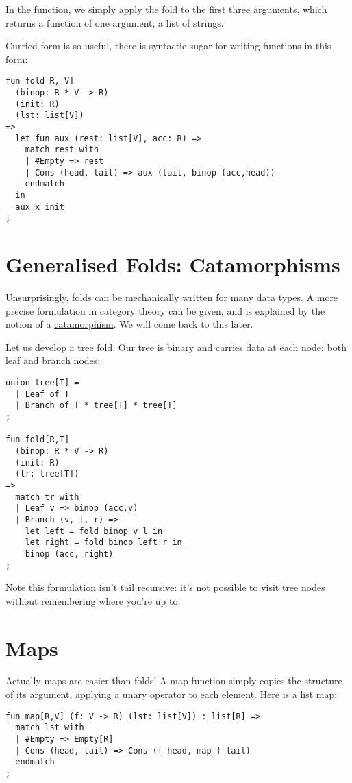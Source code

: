 \documentclass[oneside]{book}
\begin{document}
In the function, we simply apply the fold to the
first three arguments, which returns a function 
of one argument, a list of strings.

Curried form is so useful, there is syntactic sugar
for writing functions in this form:

\begin{verbatim}
fun fold[R, V] 
  (binop: R * V -> R)
  (init: R)
  (lst: list[V])
=>
  let fun aux (rest: list[V], acc: R) =>
    match rest with
    | #Empty => rest
    | Cons (head, tail) => aux (tail, binop (acc,head))
    endmatch
  in 
  aux x init
;
\end{verbatim}

\section{Generalised Folds: Catamorphisms}
Unsurprisingly, folds can be mechanically written
for many data types. A more precise formulation in
category theory can be given, and is explained by
the notion of a
\href{https://en.wikipedia.org/wiki/Catamorphism}{catamorphism}.
We will come back to this later.

Let us develop a tree fold. Our tree is binary and carries
data at each node: both leaf and branch nodes:

\begin{verbatim}
union tree[T] =
  | Leaf of T
  | Branch of T * tree[T] * tree[T]
;

fun fold[R,T]
  (binop: R * V -> R)
  (init: R)
  (tr: tree[T])
=>
  match tr with
  | Leaf v => binop (acc,v)
  | Branch (v, l, r) =>
    let left = fold binop v l in
    let right = fold binop left r in
    binop (acc, right)
;
\end{verbatim}

Note this formulation isn't tail recursive: it's not possible
to visit tree nodes without remembering where you're up to.

\section{Maps}
Actually maps are easier than folds! A map function simply
copies the structure of its argument, applying a unary operator
to each element. Here is a list map:

\begin{verbatim}
fun map[R,V] (f: V -> R) (lst: list[V]) : list[R] =>
  match lst with
  | #Empty => Empty[R]
  | Cons (head, tail) => Cons (f head, map f tail)
  endmatch
;
\end{verbatim}
\end{document}
